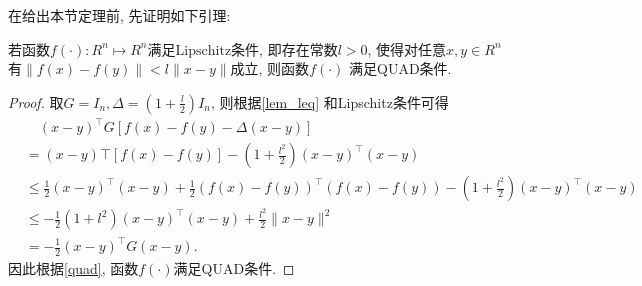         在给出本节定理前, 先证明如下引理:
         \begin{lem}\label{lem:7}
            若函数$f(\cdot): R^n\mapsto R^n$满足$\mathrm{Lipschitz}$条件, 即存在常数$l>0$, 使得对任意$x, y\in R^n$有$\| f(x)-f(y)\|<l\| x-y\|$成立, 则函数$f(\cdot)$ 满足QUAD条件.
        \end{lem}
        \begin{proof}
            取$G=I_n, \Delta=(1+\frac{l}{2})I_n$, 则根据\autoref{lem_leq} 和Lipschitz条件可得
            \begin{align*}
              &\quad(x-y)^\top G[f(x)-f(y)-\Delta(x-y)]\\
              &=(x-y)\top[f(x)-f(y)]-(1+\frac{l^2}{2})(x-y)^\top(x-y)\\
              &\leq\frac{1}{2}(x-y)^\top(x-y)+\frac{1}{2}(f(x)-f(y))^\top(f(x)-f(y))-(1+\frac{l^2}{2})(x-y)^\top(x-y)\\
              &\leq-\frac{1}{2}(1+l^2)(x-y)^\top(x-y)+\frac{l^2}{2}\| x-y\|^2\\
              &=-\frac{1}{2}(x-y)^\top G(x-y).
            \end{align*}
            因此根据\autoref{quad}, 函数$f(\cdot)$满足QUAD条件.
        \end{proof}


